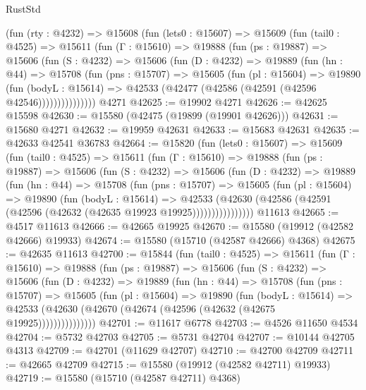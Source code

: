 \begin{lexlean}{RustStd}
\begin{coremodule}
    (fun (rty : @4232) =>
    @15608
      (fun (lets0 : @15607) =>
      @15609
        (fun (tail0 : @4525) =>
        @15611
          (fun (Γ : @15610) =>
          @19888
            (fun (ps : @19887) =>
            @15606
              (fun (S : @4232) =>
              @15606
                (fun (D : @4232) =>
                @19889
                  (fun (hn : @44) =>
                  @15708
                    (fun (pns : @15707) =>
                    @15605
                      (fun (pl : @15604) =>
                      @19890
                        (fun (bodyL : @15614) =>
                        @42533 (@42477 (@42586 (@42591 (@42596 @42546)))))))))))))))
    @4271
@42625 := @19902 @4271
@42626 := @42625 @15598
@42630 := @15580 (@42475 (@19899 (@19901 @42626)))
@42631 := @15680 @4271
@42632 := @19959 @42631
@42633 := @15683 @42631
@42635 := @42633 @42541 @36783
@42664 := @15820
    (fun (lets0 : @15607) =>
    @15609
      (fun (tail0 : @4525) =>
      @15611
        (fun (Γ : @15610) =>
        @19888
          (fun (ps : @19887) =>
          @15606
            (fun (S : @4232) =>
            @15606
              (fun (D : @4232) =>
              @19889
                (fun (hn : @44) =>
                @15708
                  (fun (pns : @15707) =>
                  @15605
                    (fun (pl : @15604) =>
                    @19890
                      (fun (bodyL : @15614) =>
                      @42533
                        (@42630
                          (@42586 (@42591 (@42596 (@42632 (@42635 @19923 @19925))))))))))))))))
    @11613
@42665 := @4517 @11613
@42666 := @42665 @19925
@42670 := @15580 (@19912 (@42582 @42666) @19933)
@42674 := @15580 (@15710 (@42587 @42666) @4368)
@42675 := @42635 @11613
@42700 := @15844
    (fun (tail0 : @4525) =>
    @15611
      (fun (Γ : @15610) =>
      @19888
        (fun (ps : @19887) =>
        @15606
          (fun (S : @4232) =>
          @15606
            (fun (D : @4232) =>
            @19889
              (fun (hn : @44) =>
              @15708
                (fun (pns : @15707) =>
                @15605
                  (fun (pl : @15604) =>
                  @19890
                    (fun (bodyL : @15614) =>
                    @42533 (@42630 (@42670 (@42674 (@42596 (@42632 (@42675 @19925)))))))))))))))
@42701 := @11617 @6778
@42703 := @4526 @11650 @4534
@42704 := @5732 @42703
@42705 := @5731 @42704
@42707 := @10144 @42705 @4313
@42709 := @42701 (@11629 @42707)
@42710 := @42700 @42709
@42711 := @42665 @42709
@42715 := @15580 (@19912 (@42582 @42711) @19933)
@42719 := @15580 (@15710 (@42587 @42711) @4368)

\end{coremodule}
\end{lexlean}
